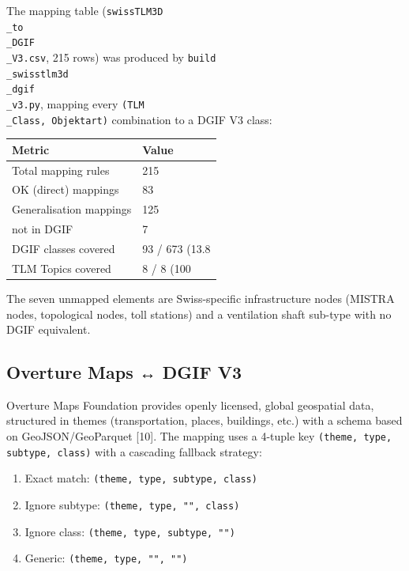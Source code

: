 \documentclass[conference]{IEEEtran}
\begin{document}
The mapping table (\texttt{swissTLM3D\\_to\\_DGIF\\_V3.csv}, 215 rows) was produced by \texttt{build\\_swisstlm3d\\_dgif\\_v3.py}, mapping every \texttt{(TLM\\_Class, Objektart)} combination to a DGIF V3 class:

\begin{center}
\begin{longtable}{p{}p{}}
Metric & Value \\
\midrule
Total mapping rules & 215 \\
OK (direct) mappings & 83 \\
Generalisation mappings & 125 \\
not in DGIF & 7 \\
DGIF classes covered & 93 / 673 (13.8\\%
TLM Topics covered & 8 / 8 (100\\%
\end{longtable}
\end{center}


The seven unmapped elements are Swiss-specific infrastructure nodes (MISTRA nodes, topological nodes, toll stations) and a ventilation shaft sub-type with no DGIF equivalent.

\subsection{Overture Maps ↔ DGIF V3}

Overture Maps Foundation provides openly licensed, global geospatial data, structured in themes (transportation, places, buildings, etc.) with a schema based on GeoJSON/GeoParquet [10]. The mapping uses a 4-tuple key \texttt{(theme, type, subtype, class)} with a cascading fallback strategy:

\begin{enumerate}[leftmargin=*]
\item Exact match: \texttt{(theme, type, subtype, class)}
\item Ignore subtype: \texttt{(theme, type, "", class)}
\item Ignore class: \texttt{(theme, type, subtype, "")}
\item Generic: \texttt{(theme, type, "", "")}
\end{enumerate}
\end{document}
